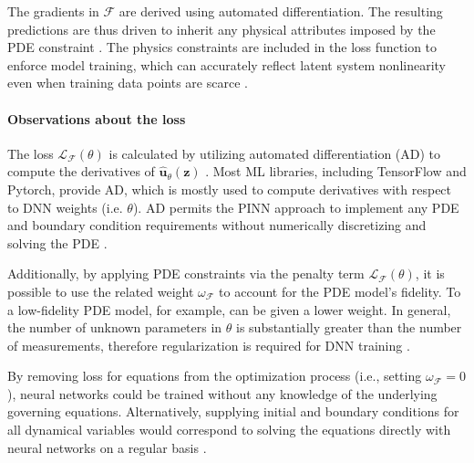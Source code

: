 \documentclass[pdflatex,sn-basic]{sn-jnl}%
\theoremstyle{thmstyleone}%
\theoremstyle{thmstyletwo}%
\theoremstyle{thmstylethree}%
\begin{document}
The gradients in $ \mathcal{F}$ are derived using automated differentiation.
The resulting predictions are thus driven to inherit any physical attributes imposed by the PDE constraint \citep{Yan2019_AdversarialUncertaintyQuantification_PerYP}.  
The physics constraints are included in the loss function to enforce model training, which can accurately reflect latent system nonlinearity even when training data points are scarce \citep{Zha2020_PhysicsInformedMulti_LiuZLS}.



\paragraph{Observations about the loss}

The loss $\mathcal{L}_\mathcal{F}(\theta)$ is calculated by utilizing automated differentiation (AD) to compute the derivatives of $\hat{\bm{u}}_\theta(\bm{z})$ \citep{He2020_PhysicsInformedNeural_BarHBTT}.
Most ML libraries, including TensorFlow and Pytorch, provide AD, which is mostly used to compute derivatives with respect to DNN weights (i.e. $\theta$).
AD permits the PINN approach to implement any PDE and boundary condition requirements without numerically discretizing and solving the PDE \citep{He2020_PhysicsInformedNeural_BarHBTT}.

Additionally, by applying PDE constraints via the penalty term $\mathcal{L}_\mathcal{F}(\theta)$, it is possible to use the related weight $\omega_\mathcal{F}$ to account for the PDE model's fidelity. %
To a low-fidelity PDE model, for example, can be given a lower weight.
In general, the number of unknown parameters in $\theta$ is substantially greater than the number of measurements, therefore regularization is required for DNN training \citep{He2020_PhysicsInformedNeural_BarHBTT}.



By removing loss for equations from the optimization process (i.e., setting $\omega_\mathcal{F}=0$), neural networks could be trained without any knowledge of the underlying governing equations.
Alternatively, supplying initial and boundary conditions for all dynamical variables would correspond to solving the equations directly with neural networks on a regular basis \citep{Mat2021_UncoveringTurbulentPlasma_FraMFH}.
\end{document}
